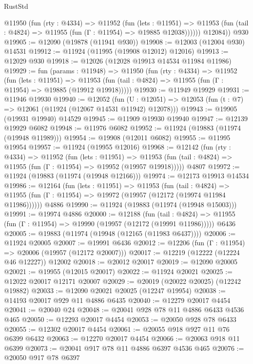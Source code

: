 \begin{lexlean}{RustStd}
\begin{coremodule}
          @11950
            (fun (rty : @4334) =>
            @11952
              (fun (lets : @11951) =>
              @11953 (fun (tail : @4824) => @11955 (fun (Γ : @11954) => @19885 @12038))))))
        @12084))
    @930
@19905 := @12090 (@19878 (@11941 @930))
@19908 := @12003 (@12004 @930) @14531
@19912 := @11924 (@11995 (@19908 @12012) @12016)
@19913 := @12029 @930
@19918 := @12026 (@12028 @19913 @14534 @11984 @11986)
@19929 := fun (params : @11948) =>
  @11950
    (fun (rty : @4334) =>
    @11952
      (fun (lets : @11951) =>
      @11953 (fun (tail : @4824) => @11955 (fun (Γ : @11954) => @19885 (@19912 @19918)))))
@19930 := @11949 @19929
@19931 := @11946 @19930
@19940 := @12052
    (fun (U : @12051) => @12053 (fun (t : @7) => @12061 (@11924 (@12067 @14531 @11942) @12078)))
@19943 := @19905 (@19931 @19940) @14529
@19945 := @11909 @19930 @19940
@19947 := @12139 @19929 @6082
@19948 := @11976 @6082
@19952 := @11924 (@19883 (@11974 (@19948 @11989)))
@19954 := @19908 (@12011 @6082)
@19955 := @11995 @19954
@19957 := @11924 (@19955 @12016)
@19968 := @12142
    (fun (rty : @4334) =>
    @11952
      (fun (lets : @11951) =>
      @11953 (fun (tail : @4824) => @11955 (fun (Γ : @11954) => @19952 (@19957 @19918)))))
    @4807
@19972 := @11924 (@19883 (@11974 (@19948 @12166)))
@19974 := @12173 @19913 @14534
@19986 := @12164
    (fun (lets : @11951) =>
    @11953
      (fun (tail : @4824) =>
      @11955 (fun (Γ : @11954) => @19972 (@19957 (@12172 (@19974 @11984 @11986))))))
    @4886
@19990 := @11924 (@19883 (@11974 (@19948 @15003)))
@19991 := @19974 @4886
@20000 := @12188
    (fun (tail : @4824) => @11955 (fun (Γ : @11954) => @19990 (@19957 (@12172 (@19991 @11986)))))
    @6436
@20005 := @19883 (@11974 (@19948 (@12165 (@11983 @6437))))
@20006 := @11924 @20005
@20007 := @19991 @6436
@20012 := @12206 (fun (Γ : @11954) => @20006 (@19957 (@12172 @20007)))
@20017 := @12219 (@12222 (@12224 @46 @12227)) @12002
@20018 := @20012 @20017
@20019 := @12090 @20005
@20021 := @19955 (@12015 @20017)
@20022 := @11924 @20021
@20025 := @12022 @20017 @12171 @20007
@20029 := @20019 (@20022 @20025) (@12242 @19882)
@20033 := @12090 @20021 @20025 (@12247 @19954)
@20038 := @14193 @20017 @929 @11 @4886 @6435
@20040 := @12279 @20017 @4454
@20041 := @20040 @24
@20048 := @20041 @928 @78 @11 @4886 @6433 @4536 @465
@20050 := @12293 @20017 @4454
@20053 := @20050 @928 @78 @6433
@20055 := @12302 @20017 @4454
@20061 := @20055 @918 @927 @11 @76 @6399 @6432
@20063 := @12270 @20017 @4454
@20066 := @20063 @918 @11 @6399
@20073 := @20041 @917 @78 @11 @4886 @6397 @4536 @465
@20076 := @20050 @917 @78 @6397

\end{coremodule}
\end{lexlean}
